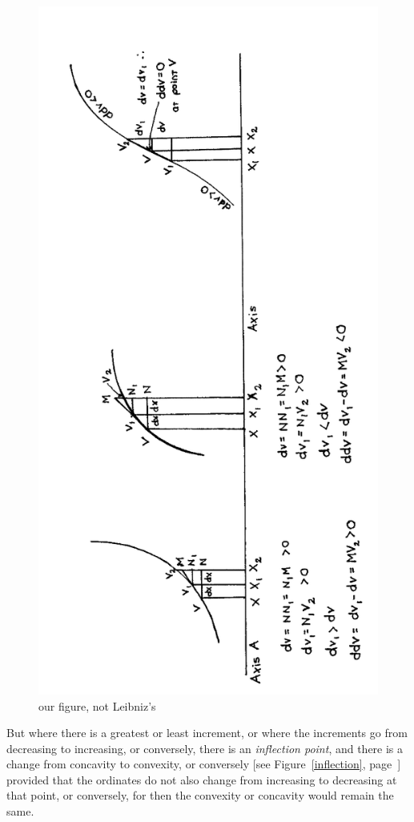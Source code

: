 \documentclass[twoside,openright]{article}
\begin{document}
\begin{figure}[htp]
  \begin{center}
    \includegraphics[width=.73\textwidth]{fig/Figure8}
    \caption{our figure, not Leibniz's}
    \label{concavity}
  \end{center}
\end{figure} But where there is a greatest or least increment, or
where the increments go from decreasing to increasing, or conversely,
there is an {\em inflection point}, and there is a change from
concavity to convexity, or conversely [see Figure~\ref{inflection},
page~\pageref{inflection}] provided that the ordinates do not also
change from increasing to decreasing at that point, or conversely, for
then the convexity or concavity would remain the same.
\end{document}
